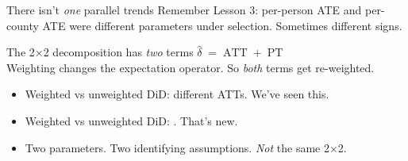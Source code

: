 \documentclass[aspectratio=169,11pt]{beamer}
\begin{document}

\begin{frame}{There isn't \textit{one} parallel trends}
\vspace{0.4em}
Remember Lesson 3: per-person ATE and per-county ATE were different parameters under selection. Sometimes different signs.
\vspace{0.5em}
\begin{block}{The 2$\times$2 decomposition has \textit{two} terms}
\small
\centering
$\widehat{\delta} \;=\; \text{ATT} \;+\; \text{PT}$ \\[0.3em]
Weighting changes the expectation operator. So \textit{both} terms get re-weighted.
\end{block}
\vspace{0.5em}
\begin{itemize}\small
  \item Weighted vs unweighted DiD: different ATTs. We've seen this.
  \item Weighted vs unweighted DiD: . \;That's new.
  \item Two parameters. Two identifying assumptions. \textit{Not} the same 2$\times$2.
\end{itemize}
\end{frame}
\end{document}
